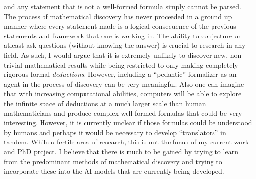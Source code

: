 and any statement that is not a well-formed formula simply cannot be parsed. The process of mathematical discovery has never proceeded in a ground up manner where every statement made is a logical consequence of the previous statements and framework that one is working in. The ability to conjecture or atleast ask questions (without knowing the answer) is crucial to research in any field. As such, I would argue that it is extremely unlikely
to discover new, non-trivial mathematical results while being restricted to only making completely rigorous formal \textit{deductions}. However, including a ``pedantic'' formalizer as an agent in the process of discovery can be very meaningful. Also one can imagine that with increasing computational abilities, computers will be able to explore the infinite space of deductions at a much larger scale than human mathematicians and produce
complex well-formed formulas that could be very interesting. However, it is currently unclear if those formulas could be understood by humans and perhaps it would be necessary to develop ``translators'' in tandem. While a fertile area of research, this is not the focus of my current work and PhD project. I believe that there is much to be gained by trying to learn from the predominant methods of mathematical discovery and trying to incorporate these into the AI models that are currently being developed.

